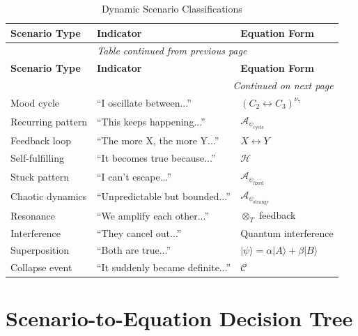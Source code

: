 \documentclass[11pt,twoside]{book}
\renewcommand{\arraystretch}{1.2}  %
\newcommand{\noe}[1]{\nu_{#1}}
\newcommand{\Tmul}{\otimes_T}
\newcommand{\PsychAttractor}{\mathcal{A}_\psi}
\newcommand{\Hyperstition}{\mathcal{H}}
\newcommand{\Collapse}{\mathcal{C}}
\begin{document}
\begin{center}
\small
\renewcommand{\arraystretch}{1.3}
\begin{longtable}{p{2.5cm}|p{3cm}|p{4cm}}
\caption{Dynamic Scenario Classifications} \\
\toprule
\textbf{Scenario Type} & \textbf{Indicator} & \textbf{Equation Form} \\
\midrule
\endfirsthead
\multicolumn{3}{c}{\textit{Table continued from previous page}} \\
\toprule
\textbf{Scenario Type} & \textbf{Indicator} & \textbf{Equation Form} \\
\midrule
\endhead
\midrule
\multicolumn{3}{r}{\textit{Continued on next page}} \\
\endfoot
\bottomrule
\endlastfoot
Mood cycle & ``I oscillate between...'' & $(C_2 \leftrightarrow C_3)^{\noe{7}}$ \\
Recurring pattern & ``This keeps happening...'' & $\PsychAttractor_{\mathrm{cycle}}$ \\
Feedback loop & ``The more X, the more Y...'' & $X \leftrightarrow Y$ \\
Self-fulfilling & ``It becomes true because...'' & $\Hyperstition$ \\
Stuck pattern & ``I can't escape...'' & $\PsychAttractor_{\mathrm{fixed}}$ \\
Chaotic dynamics & ``Unpredictable but bounded...'' & $\PsychAttractor_{\mathrm{strange}}$ \\
Resonance & ``We amplify each other...'' & $\Tmul$ feedback \\
Interference & ``They cancel out...'' & Quantum interference \\
Superposition & ``Both are true...'' & $|\psi\rangle = \alpha|A\rangle + \beta|B\rangle$ \\
Collapse event & ``It suddenly became definite...'' & $\Collapse$ \\
\end{longtable}
\end{center}

\section{Scenario-to-Equation Decision Tree}
\end{document}
